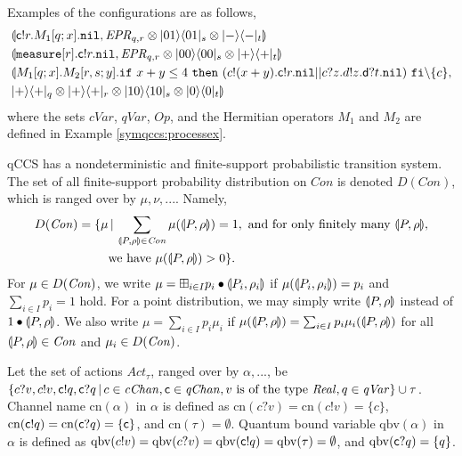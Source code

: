 \begin{ex} 
Examples of the configurations are as follows,
  \begin{align*}
  &\llparenthesis \mathsf{c}! r. M_1[q;x].\mathtt{nil}, \mathit{EPR}_{q,r}
   \otimes |01\rangle\langle 01|_s \otimes |-\rangle\langle -|_t \rrparenthesis\\
  &\llparenthesis \mathtt{measure}[r]. \mathsf{c}! r. \mathtt{nil}, \mathit{EPR}_{q,r} \otimes |00\rangle\langle 00|_s
   \otimes |+\rangle\langle +|_t \rrparenthesis\\
  &\llparenthesis M_1[q;x].M_2[r,s;y].\mathtt{if}~x + y \le
	4~\mathtt{then}~(c!(x+y).\mathsf{c}! r.\mathtt{nil}||
	c?z.d!z.\mathsf{d}? t.\mathtt{nil})~\mathtt{fi}\backslash\{c\}, \\&|+\rangle\langle +|_q \otimes |+\rangle\langle +|_r \otimes |10\rangle\langle 10|_s
   \otimes |0\rangle\langle 0|_t \rrparenthesis
 \end{align*}
where the sets $\mathit{cVar}$,
$\mathit{qVar}$, $\mathit{Op}$,
and the Hermitian operators $M_1$ and $M_2$
are defined in Example \ref{symqccs:processex}.
\end{ex}

qCCS has a nondeterministic and 
finite-support probabilistic transition system.
The set of all finite-support 
probability distribution on $\mathit{Con}$ is denoted $D(\mathit{Con})$,
which is ranged over by $\mu, \nu,...$.
Namely,
\begin{align*}
D(\mathit{Con})=\{\mu &\,|\, \sum_{\llparenthesis P, \rho \rrparenthesis \in \mathit{Con}}
\mu(\llparenthesis P, \rho \rrparenthesis) = 1, \mbox{ and for only finitely many }
\llparenthesis P, \rho \rrparenthesis,\\
&\mbox{we have } \mu(\llparenthesis P, \rho \rrparenthesis) > 0 \}. 
\end{align*}
For $\mu \in D(\mathit{Con})$, we write
$\mu = \boxplus_{i \in I} p_i \bullet \llparenthesis P_i, \rho_i \rrparenthesis$ if
$\mu(\llparenthesis P_i, \rho_i \rrparenthesis) = p_i$ and $\sum_{i \in I} p_i = 1$ hold.
For a point distribution, we may simply write $\llparenthesis P, \rho \rrparenthesis$ instead of
$1 \bullet \llparenthesis P, \rho \rrparenthesis$.
We also write $\mu = \sum_{i \in I} p_i \mu_i$ if $\mu(\llparenthesis P, \rho \rrparenthesis) =
\sum_{i \in
I} p_i \mu_i(\llparenthesis P, \rho \rrparenthesis)$ for all $\llparenthesis P, \rho \rrparenthesis \in \mathit{Con}$ and $\mu_i
\in D(\mathit{Con})$.

Let the set of actions $\mathit{Act}_{\tau}$, ranged over by
$\alpha,...$, be $\{c?v, c!v, \mathsf{c}! q, \mathsf{c}? q \,|\,
c \in \mathit{cChan}, \mathsf{c} \in \mathit{qChan}, 
v \mbox{ is of the type } \mathit{Real}, q \in \mathit{qVar}\} \cup {\tau}$.
Channel name $\mathrm{cn}(\alpha)$ in $\alpha$
is defined as $\mathrm{cn}(c?v) =
\mathrm{cn}(c!v) = \{c\}$, $\mathrm{cn}(\mathsf{c}! q) =
\mathrm{cn}(\mathsf{c}? q) = \{\mathsf{c}\}$, and
$\mathrm{cn}(\tau) = \emptyset$.
Quantum bound variable $\mathrm{qbv}(\alpha)$ in $\alpha$ is defined as
$\mathrm{qbv}(c!v) = \mathrm{qbv}(c?v) =
\mathrm{qbv}(\mathsf{c}! q) = 
\mathrm{qbv}(\tau) = \emptyset$, and
$\mathrm{qbv}(\mathsf{c}? q) = \{q\}$.

